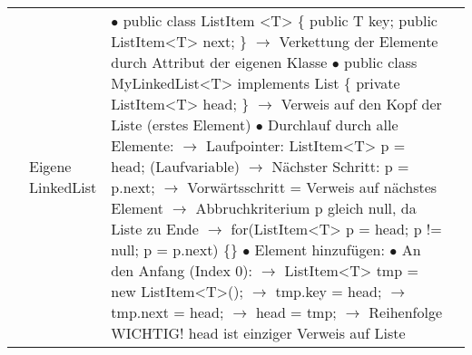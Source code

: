 \documentclass[11pt,a4paper]{article}
\begin{document}
\begin{center}
\begin{longtable}[h]{ | p{2.3cm} | p{2.3cm} | p{12.6cm} | p{1.2cm} | }
	& \makecell[l]{Eigene \\ LinkedList} & \makecell[l]{$\bullet$ public class ListItem <T> \{ \\ 
	\hspace{5cm} public T key; \\ 
	\hspace{5cm} public ListItem<T> next; \} \\
	\hspace{0.4cm} $\rightarrow$ Verkettung der Elemente durch Attribut der eigenen Klasse \\ 
	$\bullet$ public class MyLinkedList<T> implements List \{ \\
	\hspace{3cm} private ListItem<T> head; \} \\
	\hspace{0.4cm} $\rightarrow$ Verweis auf den Kopf der Liste (erstes Element)\\
	$\bullet$ Durchlauf durch alle Elemente: \\ 
	\hspace{0.4cm} $\rightarrow$ Laufpointer: ListItem<T> p = head; (Laufvariable) \\
	\hspace{0.4cm} $\rightarrow$ Nächster Schritt: p = p.next; \\
	\hspace{0.4cm} $\rightarrow$ Vorwärtsschritt = Verweis auf nächstes Element \\
	\hspace{0.4cm} $\rightarrow$ Abbruchkriterium p gleich null, da Liste zu Ende \\
	\hspace{0.4cm} $\rightarrow$ for(ListItem<T> p = head; p != null; p = p.next) \{\} \\
	$\bullet$ Element hinzufügen: \\
	\hspace{0.4cm} $\bullet$ An den Anfang (Index 0): \\
	\hspace{0.6cm} $\rightarrow$ ListItem<T> tmp = new ListItem<T>(); \\
	\hspace{0.6cm} $\rightarrow$ tmp.key = head; \\
	\hspace{0.6cm} $\rightarrow$ tmp.next = head; \\
	\hspace{0.6cm} $\rightarrow$ head = tmp; \\
	\hspace{0.6cm} $\rightarrow$ Reihenfolge WICHTIG! head ist einziger Verweis auf Liste \\ 
}
\end{longtable}
\end{center}
\end{document}
